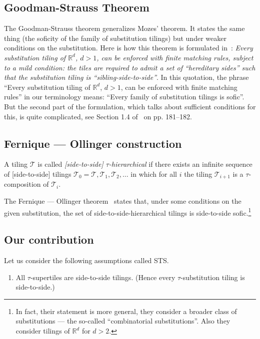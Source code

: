 \documentclass[12pt]{article}
\theoremstyle{remark}
\newcommand{\R}{\mathbb R}
\begin{document}
\subsection{Goodman-Strauss Theorem}
The Goodman-Strauss theorem generalizes Mozes' theorem. It
states the same thing (the soficity of
the family of substitution tilings) but under weaker conditions
on the substitution.
Here is how this theorem is formulated in~\cite{gs}:
\emph{Every substitution tiling of $\R^d$, $d > 1$, can be enforced with finite
matching rules, subject to a mild condition: the tiles are required to admit a set of ``hereditary sides''
such that the substitution tiling is ``sibling-side-to-side''}. In this quotation, the phrase
``Every substitution tiling of $\R^d$, $d > 1$, can be enforced with finite matching rules'' in our terminology means: ``Every family of substitution tilings is sofic''.
But the second part of the formulation, which talks about sufficient conditions for this,
is quite complicated, see Section 1.4 of~\cite{gs} on pp.  181--182. 

\subsection{Fernique --- Ollinger construction}

A tiling $\mathcal{T}$
is called \emph{[side-to-side] $\tau$-hierarchical} 
if there exists an infinite sequence of
[side-to-side]
tilings
$\mathcal{T}_0=\mathcal{T},\mathcal{T}_1,\mathcal{T}_2,\dots$ in which for all $i$ the tiling $\mathcal{T}_{i+1}$ is a $\tau$-composition of $\mathcal{T}_i$.


The Fernique --- Ollinger theorem~\cite{fo} states that, under some conditions on the given substitution, the set of side-to-side-hierarchical
tilings is side-to-side sofic.\footnote{In fact, their statement is more general, they consider a broader class of substitutions
--- the so-called ``combinatorial substitutions''. Also they consider tilings of $\R^d$ for $d>2$.} 

\subsection{Our contribution}

Let us consider the following  assumptions called STS.
\begin{enumerate}
\item[STS:]\label{r0}
  All $\tau$-supertiles are side-to-side tilings.  (Hence
  every $\tau$-substitution tiling is side-to-side.) 
\end{enumerate}
\end{document}
